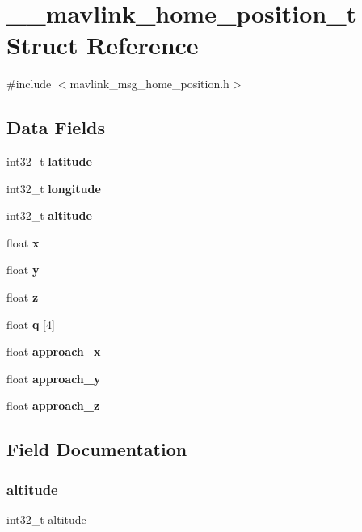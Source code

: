\section{\+\_\+\+\_\+mavlink\+\_\+home\+\_\+position\+\_\+t Struct Reference}
\label{struct____mavlink__home__position__t}


{\ttfamily \#include $<$mavlink\+\_\+msg\+\_\+home\+\_\+position.\+h$>$}

\subsection*{Data Fields}
\begin{DoxyCompactItemize}
\item 
int32\+\_\+t \textbf{ latitude}
\item 
int32\+\_\+t \textbf{ longitude}
\item 
int32\+\_\+t \textbf{ altitude}
\item 
float \textbf{ x}
\item 
float \textbf{ y}
\item 
float \textbf{ z}
\item 
float \textbf{ q} [4]
\item 
float \textbf{ approach\+\_\+x}
\item 
float \textbf{ approach\+\_\+y}
\item 
float \textbf{ approach\+\_\+z}
\end{DoxyCompactItemize}


\subsection{Field Documentation}
\mbox{\label{struct____mavlink__home__position__t_a5402881d7f8a92e6838995507bf2e7f9}} 
\subsubsection{altitude}
{\footnotesize\ttfamily int32\+\_\+t altitude}

\mbox{\label{struct____mavlink__home__position__t_a052a6885cf6ccdfef3046822a9d0d209}} 
